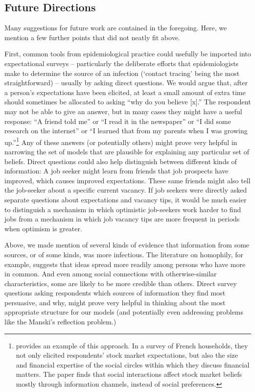 \subsection{Future Directions}\label{subsec:future}\hypertarget{future}{}

Many suggestions for future work are contained in the foregoing.  Here, we mention a few further points that did not neatly fit above.

First, common tools from epidemiological practice could usefully be imported into expectational surveys -- particularly the deliberate efforts that epidemiologists make to determine the source of an infection (`contact tracing' being the most straightforward) -- usually by asking direct questions.  We would argue that, after a person's expectations have been elicited, at least a small amount of extra time should sometimes be allocated to asking ``why do you believe [x].''  The respondent may not be able to give an answer, but in many cases they might have a useful response: ``A friend told me'' or ``I read it in the newspaper'' or ``I did some research on the internet'' or ``I learned that from my parents when I was growing up.''\footnote{\cite{arrondel2020informative} provides an example of this approach. In a survey of French households, they not only elicited respondents' stock market expectations, but also the size and financial expertise of the social circles within which they discuss financial matters. The paper finds that social interactions affect stock market beliefs mostly through information channels, instead of social  preferences.} Any of these answers (or potentially others) might prove very helpful in narrowing the set of models that are plausible for explaining any particular set of beliefs.  Direct questions could also help distinguish between different kinds of information: A job seeker might learn from friends that job prospects have improved, which causes improved expectations. These same friends might also tell the job-seeker about a specific current vacancy.  If job seekers were directly asked separate questions about expectations and vacancy tips, it would be much easier to distinguish a mechanism in which optimistic job-seekers work harder to find jobs from a mechanism in which job vacancy tips are more frequent in periods when optimism is greater.

Above, we made mention of several kinds of evidence that information from some sources, or of some kinds, was more infectious.  The literature on homophily, for example, suggests that ideas spread more readily among persons who have more in common.  And even among social connections with otherwise-similar characteristics, some are likely to be more credible than others.  %
Direct survey questions asking respondents which sources of information they find most persuasive, and why, might prove very helpful in thinking about the most appropriate structure for our models (and potentially even addressing problems like the Manski's reflection problem.)

